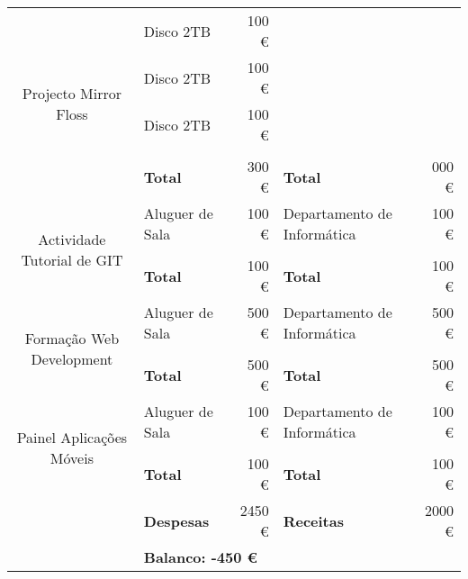 \begin{center}
{\begin{tabular}{| c | l | r | l | r |}
\multirow{5}{*}{Projecto Mirror Floss}
							& Disco 2TB			 	& 100 \euro		& 								&					\\ \cline{2-5}
							& Disco 2TB			 	& 100 \euro		& 								&					\\ \cline{2-5}
							& Disco 2TB			 	& 100 \euro		& 								&					\\ \cline{2-5}
							&						&				&								&					\\ \cline{2-5}
							& \textbf{Total}		& 300 \euro		& \textbf{Total}				& 000 \euro			\\ \cline{1-5} \hline

\multirow{3}{*}{Actividade Tutorial de GIT}
							& Aluguer de Sala	 	& 100 \euro		& Departamento de Informática 	& 100 \euro			\\ \cline{2-5}
							&						&				&								&					\\ \cline{2-5}
							& \textbf{Total}		& 100 \euro		& \textbf{Total}				& 100 \euro			\\ \cline{1-5} \hline

\multirow{3}{*}{Formação Web Development}
							& Aluguer de Sala	 	& 500 \euro		& Departamento de Informática 	& 500 \euro			\\ \cline{2-5}
							&						&				&								&					\\ \cline{2-5}
							& \textbf{Total}		& 500 \euro		& \textbf{Total}				& 500 \euro			\\ \cline{1-5} \hline

\multirow{3}{*}{Painel Aplicações Móveis}
							& Aluguer de Sala	 	& 100 \euro		& Departamento de Informática 	& 100 \euro			\\ \cline{2-5}
							&						&				&								&					\\ \cline{2-5}
							& \textbf{Total}		& 100 \euro		& \textbf{Total}				& 100 \euro			\\ \cline{1-5} \hline
			
\hline
							& \textbf{Despesas}		& 2450 \euro	& \textbf{Receitas}				& 2000 \euro		\\ \hline
							& \multicolumn{4}{|l|}{\textbf{Balanco: -450 \euro}}															\\ \hline
\end{tabular}
}

\end{center}
